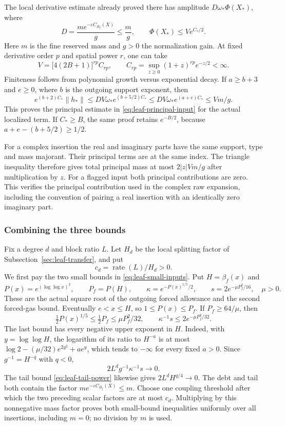 The local derivative estimate already proved there has amplitude
$D\omega_*\Phi(X_*)$, where
\[
 D=\frac{m e^{-\varepsilon C_{B_f}(X)}}g\le\frac mg,
 \qquad \Phi(X_*)\le V e^{C_*/2}.
\]
Here $m$ is the fine reserved mass and $g>0$ the normalization
gain. At fixed derivative order $p$ and spatial power $r$, one can
take
\[
 V=\bigl[4(2B+1)\bigr]^{rp} C_{rp},\qquad
 C_{rp}=\sup_{z\ge0}(1+z)^{rp}e^{-z/2}<\infty.
\]
Finiteness follows from polynomial growth versus exponential decay.
If $a\ge b+3$ and $e\ge0$, where $b$ is the outgoing support
exponent, then
\[
 e^{(b+2)C_*}\|h_*\|
 \le DV\omega_* e^{(b+5/2)C_*}
 \le DV\omega_*e^{(a+e)C_*}
 \le Vm/g.
\]
This proves the principal estimate in
\eqref{eq:leaf-principal-input} for the actual localized term.
If $C_*\ge B$, the same proof retains $e^{-B/2}$, because
$a+e-(b+5/2)\ge1/2$.

For a complex insertion the real and imaginary parts have the
same support, type and mass majorant. Their principal terms are
at the same index. The triangle inequality therefore gives total
principal mass at most $2|z|Vm/g$ after multiplication by $z$.
For a flagged input both principal contributions are zero. This
verifies the principal contribution used in the complex raw
expansion, including the convention of pairing a real insertion
with an identically zero imaginary part.

\subsubsection{Combining the three bounds}
Fix a degree $d$ and block ratio $L$. Let $H_d$ be the local
splitting factor of Subsection~\ref{sec:leaf-transfer}, and put
\[
                 c_d=\operatorname{rate}(L)/H_d>0.
\]
We first pay the two small bounds in
\eqref{eq:leaf-small-inputs}. Put $H=\beta_f(x)$ and
\[
 P(x)=e^{(\log\log x)^2},\qquad P_f=P(H),\qquad
 \kappa=e^{-P(x)^{1/5}/2},\qquad
 s=2e^{-\mu P_f^2/16},\quad \mu>0.
\]
These are the actual square root of the outgoing forced allowance
and the second forced-gas bound. Eventually $e<x\le H$, so
$1\le P(x)\le P_f$. If $P_f\ge64/\mu$, then
\[
 \tfrac12P(x)^{1/5}\le\tfrac12P_f
                     \le\mu P_f^2/32,
 \qquad \kappa^{-1}s\le2e^{-\mu P_f^2/32}.
\]
The last bound has every negative upper exponent in $H$.
Indeed, with $y=\log\log H$, the logarithm of its ratio to
$H^{-a}$ is at most
$\log2-(\mu/32)e^{2y^2}+ae^y$, which tends to $-\infty$
for every fixed $a>0$. Since $g^{-1}=H^{-q}$ with $q<0$,
\[
           2L^d g^{-1}\kappa^{-1}s\longrightarrow0.
\]
The tail bound \eqref{eq:leaf-tail-power} likewise gives
$2L^d H^{q/4}\to0$. The debt and tail both contain the factor
$m e^{-\varepsilon C_{B_f}(X)}\le m$. Choose one coupling
threshold after which the two preceding scalar factors are
at most $c_d$. Multiplying by this nonnegative mass factor proves
both small-bound inequalities uniformly over all insertions,
including $m=0$; no division by $m$ is used.

